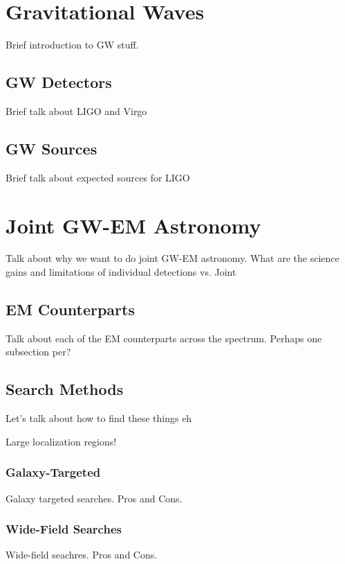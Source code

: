 
\section{Gravitational Waves}
\label{sec:intro_gw}
Brief introduction to GW stuff.

\subsection{GW Detectors}
\label{sec:intro_gw_det}
Brief talk about LIGO and Virgo

\subsection{GW Sources}
\label{sec:intro_gw_source}
Brief talk about expected sources for LIGO

\section{Joint GW-EM Astronomy}
\label{sec:intro_joint}
Talk about why we want to do joint GW-EM astronomy. What are the science gains and limitations of individual detections vs. Joint

\subsection{EM Counterparts}
\label{sec:intro_counterparts}
Talk about each of the EM counterparts across the spectrum. Perhaps one subsection per?

\subsection{Search Methods}
\label{sec:intro_searchmethods}
Let's talk about how to find these things eh

Large localization regions!

\subsubsection{Galaxy-Targeted}
\label{sec:intro_galaxy}
Galaxy targeted searches. Pros and Cons.

\subsubsection{Wide-Field Searches}
\label{sec:intro_widefield}
Wide-field seachres. Pros and Cons.

